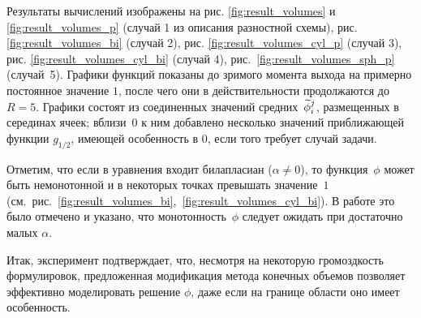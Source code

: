 Результаты вычислений изображены на рис. \ref{fig:result_volumes} и \ref{fig:result_volumes_p} (случай 1 из описания разностной схемы), рис. \ref{fig:result_volumes_bi} (случай 2), рис. \ref{fig:result_volumes_cyl_p} (случай 3), рис. \ref{fig:result_volumes_cyl_bi} (случай 4), рис.~\ref{fig:result_volumes_sph_p} (случай~5). Графики функций показаны до зримого момента выхода на примерно постоянное значение $1$, после чего они в действительности продолжаются до $R = 5$. Графики состоят из соединенных значений средних~${\widetilde{\phi}}_i^j$, размещенных в серединах ячеек; вблизи~$0$ к ним добавлено несколько значений приближающей функции $g_{1/2}$, имеющей особенность в $0$, если того требует случай задачи.

Отметим, что если в уравнения входит билапласиан ($\alpha \neq 0$), то функция~$\phi$ может быть немонотонной и в некоторых точках превышать значение~$1$ (см.~рис.~\ref{fig:result_volumes_bi},~\ref{fig:result_volumes_cyl_bi}). В работе \cite{zipunova_higher_codimension} это было отмечено и указано, что монотонность~$\phi$ следует ожидать при достаточно малых $\alpha$.

Итак, эксперимент подтверждает, что, несмотря на некоторую громоздкость формулировок, предложенная модификация метода конечных объемов позволяет эффективно моделировать решение $\phi$, даже если на границе области оно имеет особенность.